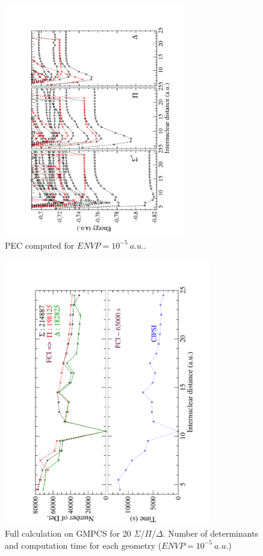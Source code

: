 \documentclass[a4paper,10pt]{article}
\begin{document}
 \begin{figure}[ht!]
  \begin{center}
        \includegraphics[angle=270,width=0.7\textwidth]{fig/RbCa_PECs.pdf}
    \caption{\label{pec_rbca} \small PEC computed for $ENVP=10^{-5}~a.u.$.}
  \end{center}
\end{figure}


 \begin{figure}[hb!]
  \begin{center}
        \includegraphics[angle=270,width=0.8\textwidth]{fig/time_GMPCS_RbCa.pdf}
    \caption{\label{time_l_rbca} \small Full calculation on GMPCS for 20 $\Sigma$/$\Pi$/$\Delta$. Number of determinants and computation time for each geometry ($ENVP=10^{-5}~a.u.$)}
  \end{center}
\end{figure}
\end{document}
